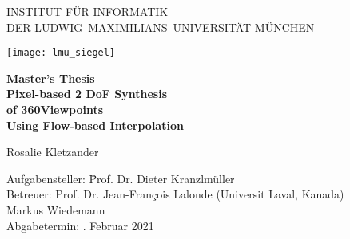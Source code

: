 \begin{center}

\vspace*{-2cm}

{\Huge INSTITUT FÜR INFORMATIK\\[1mm]}
DER LUDWIG--MAXIMILIANS--UNIVERSITÄT MÜNCHEN\\

\vspace*{1cm}

\texttt{[image: lmu\_siegel]}

\vspace*{2cm}

{\Large \textbf{Master's Thesis}}\\

\vspace{2.0cm}
{\Huge \textbf{Pixel-based 2 DoF Synthesis}}\\
\vspace*{3mm}
{\Huge \textbf{of 360\degree Viewpoints}}\\
\vspace*{3mm}
{\Huge \textbf{Using Flow-based Interpolation}}\\
\vspace{1.5cm}

{\LARGE Rosalie Kletzander} %
\vspace{2cm}

\parbox{1cm}{
\begin{large}
\begin{tabbing}
Aufgabensteller: \hspace{.5cm} \=Prof. Dr. Dieter Kranzlmüller\\[2mm]
Betreuer:
\>Prof. Dr. Jean-Fran\c{c}ois Lalonde (Universit Laval, Kanada)\\
\>Markus Wiedemann\\[5mm]%
Abgabetermin: . Februar 2021\\
\end{tabbing}
\end{large}}\\
\vspace{5mm}

\end{center}
